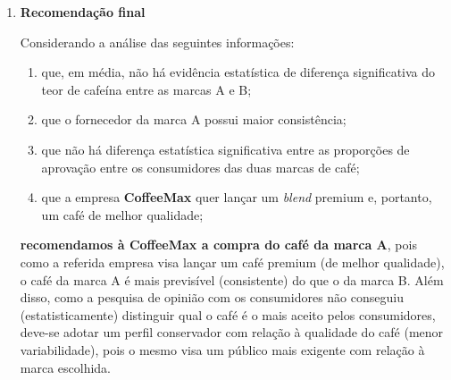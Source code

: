 \documentclass[11pt]{article}
\begin{document}
\begin{enumerate}
    \item \textbf{Recomendação final}

    Considerando a análise das seguintes informações:

    \begin{enumerate}[label=\alph*)]
        \item que, em média, não há evidência estatística de diferença
        significativa do teor de cafeína entre as marcas A e B;
        \item que o fornecedor da marca A possui maior consistência;
        \item que não há diferença estatística significativa entre as proporções
        de aprovação entre os consumidores das duas marcas de café;
        \item que a empresa \textbf{CoffeeMax} quer lançar um \textit{blend}
        premium e, portanto, um café de melhor qualidade;
    \end{enumerate}

    \textbf{recomendamos à CoffeeMax a compra do café da marca A}, pois como a
    referida empresa visa lançar um café premium (de melhor qualidade), o café
    da marca A é mais previsível (consistente) do que o da marca B. Além disso,
    como a pesquisa de opinião com os consumidores não conseguiu
    (estatisticamente) distinguir qual o café é o mais aceito pelos
    consumidores, deve-se adotar um perfil conservador com relação à qualidade
    do café (menor variabilidade), pois o mesmo visa um público mais exigente
    com relação à marca escolhida.
\end{enumerate}
\end{document}
